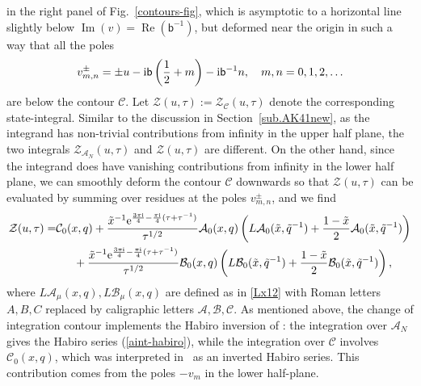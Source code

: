 \documentclass[12pt,reqno]{amsart}
\theoremstyle{definition}
\def\tq{\tilde{q}}
\def\tx{\tilde{x}}
\def\bb{\mathsf{b}}
\def\ri{\mathrm{i}}
\def\tx{\tilde{x}}
\def\re{{\rm e}}
\def\ri{{\rm i}}
\def\mc{\mathcal}
\DeclareMathOperator{\real}{Re}
\DeclareMathOperator{\imag}{Im}
\newcommand{\nn}{\nonumber \\}
\begin{document}
in the right panel of Fig.~\ref{contours-fig}, which is asymptotic to
a horizontal line slightly below $\imag(v) = \real(\bb^{-1})$, but
deformed near the origin in such a way that all the poles
%
\begin{equation}
  v^{\pm}_{m,n} = \pm u -\ri\bb\left(\frac{1}{2}+m\right)-
  \ri\bb^{-1}n,\quad m,n=0,1,2,\ldots
  \label{eq:vmn}
\end{equation}
%
are below the contour $\mc{C}$.  Let
$ \mc{Z}(u,\tau):= \mc{Z}_{\mc{C}}(u,\tau)$ denote the
corresponding state-integral. Similar to the discussion in
Section~\ref{sub.AK41new}, as the integrand has non-trivial
contributions from infinity in the upper half plane, the two integrals
$\mc{Z}_{\mc{A}_N}(u,\tau)$ and $\mc{Z}(u,\tau)$ are different.  On
the other hand, since the integrand does have vanishing contributions
from infinity in the lower half plane, we can smoothly deform the
contour $\mc{C}$ downwards so that $\mc{Z}(u,\tau)$ can be evaluated
by summing over residues at the poles $v^{\pm}_{m,n}$, and we find
%
\begin{align}
  \mc{Z}(u,\tau)=
  &\mc{C}_0(x,q)
    +\frac{\tx^{-1}\re^{\frac{3\pi\ri}{4}-\frac{\pi\ri}{4}(\tau+\tau^{-1})}}
    {\tau^{1/2}}
    \mc{A}_0(x,q)\left(L\mc{A}_{0}(\tx,\tq^{-1})
    +\frac{1-\tx}{2}\mc{A}_{0}(\tx,\tq^{-1})\right)\nn
  &\phantom{==}
    +\frac{\tx^{-1}\re^{\frac{3\pi\ri}{4}-\frac{\pi\ri}{4}(\tau+\tau^{-1})}}
    {\tau^{1/2}}
    \mc{B}_0(x,q)\left(L\mc{B}_{0}(\tx,\tq^{-1})
    +\frac{1-\tx}{2}\mc{B}_{0}(\tx,\tq^{-1})
    \right),
    \label{eq:Ixq}
\end{align}
where $L\mc{A}_{\mu}(x,q),L\mc{B}_{\mu}(x,q)$ are defined as in
\eqref{Lx12} with Roman letters $A,B,C$ replaced by caligraphic
letters $\mc{A},\mc{B},\mc{C}$. As mentioned above, the change of integration
contour implements the Habiro inversion of \cite{park-inverted}: the integration
over $\mc{A}_N$ gives the Habiro series (\ref{aint-habiro}), while the integration
over $\mc{C}$ involves $\mc{C}_0(x,q)$, which was interpreted
in~\cite{park-inverted} as an inverted Habiro series. This contribution comes
from the poles $-v_m$ in the lower half-plane. 
\end{document}
